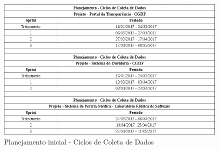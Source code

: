 \begin{figure}[!h]
\includegraphics[width=\textwidth]{figuras/planejamento.png}
\caption{Planejamento inicial - Ciclos de Coleta de Dados}
\end{figure}